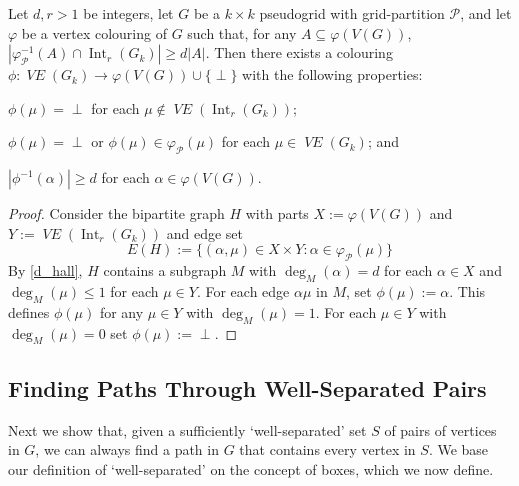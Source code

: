 \documentclass{patmorin}
\DeclareMathOperator{\interior}{Int}
\DeclareMathOperator{\VE}{\mathit{VE}}
\begin{document}
\begin{lem}\label{one_colour_per_object}
  Let $d,r>1$ be integers, let $G$ be a $k\times k$ pseudogrid with grid-partition $\mathcal{P}$, and let $\varphi$ be a vertex colouring of $G$ such that, for any $A\subseteq\varphi(V(G))$, $|\varphi_{\mathcal{P}}^{-1}(A)\cap\interior_r(G_k)| \ge d|A|$. Then there exists a colouring $\phi:\VE(G_{k})\to \varphi(V(G))\cup\{\perp\}$ with the following properties:
  \begin{compactenum}[(i)]
    \item $\phi(\mu)=\perp$ for each $\mu\not\in\VE(\interior_r(G_{k}))$;
    \item $\phi(\mu)=\perp$ or $\phi(\mu)\in\varphi_\mathcal{P}(\mu)$ for each $\mu\in\VE(G_{k})$; and
    \item $|\phi^{-1}(\alpha)|\ge d$ for each $\alpha\in\varphi(V(G))$.
  \end{compactenum}
\end{lem}

\begin{proof}
  Consider the bipartite graph $H$ with parts $X:=\varphi(V(G))$ and $Y:=\VE(\interior_r(G_k))$ and edge set
  \[
    E(H) := \{ (\alpha,\mu)\in X\times Y: \alpha\in\varphi_\mathcal{P}(\mu) \}
  \]
  By \cref{d_hall}, $H$ contains a subgraph $M$ with $\deg_M(\alpha)=d$ for each $\alpha\in X$ and $\deg_M(\mu)\le 1$ for each $\mu\in Y$.  For each edge $\alpha\mu$ in $M$, set $\phi(\mu):=\alpha$.  This defines $\phi(\mu)$ for any $\mu\in Y$ with $\deg_M(\mu)=1$.  For each $\mu\in Y$ with $\deg_M(\mu)=0$ set $\phi(\mu):=\perp$.
\end{proof}

\subsection{Finding Paths Through Well-Separated Pairs}
\label{path_finding}

Next we show that, given a sufficiently `well-separated' set $S$ of pairs of vertices in $G$, we can always find a path in $G$ that contains every vertex in $S$.
We base our definition of `well-separated' on the concept of boxes, which we now define.
\end{document}
